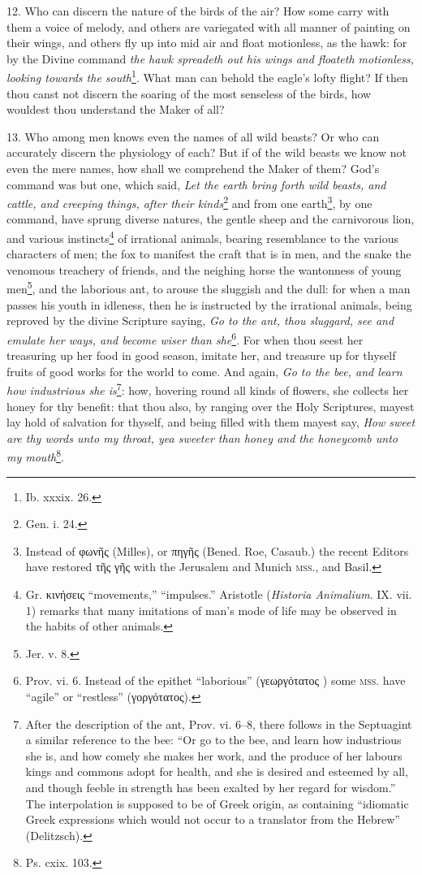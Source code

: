 12. Who can discern the nature of the birds of the air? How some carry with them a voice of melody, and others are variegated with all manner of painting on their wings, and others fly up into mid air and float motionless, as the hawk: for by the Divine command \emph{the hawk spreadeth out his wings and floateth motionless, looking towards the south}\footnote{Ib. xxxix. 26.}. What man can behold the eagle’s lofty flight? If then thou canst not discern the soaring of the most senseless of the birds, how wouldest thou understand the Maker of all?

13. Who among men knows even the names of all wild beasts? Or who can accurately discern the physiology of each? But if of the wild beasts we know not even the mere names, how shall we comprehend the Maker of them? God’s command was but one, which said, \emph{Let the earth bring forth wild beasts, and cattle, and creeping things, after their kinds}\footnote{Gen. i. 24.} and from one earth\footnote{Instead of \textgreek{φωνῆς} (Milles), or \textgreek{πηγῆς} (Bened. Roe, Casaub.) the recent Editors have restored \textgreek{τῆς γῆς} with the Jerusalem and Munich \textsc{mss.}, and Basil.}, by one command, have sprung diverse natures, the gentle sheep and the carnivorous lion, and various instincts\footnote{Gr. \textgreek{κινήσεις} “movements,” “impulses.” Aristotle (\emph{Historia Animalium}. IX. vii. 1) remarks that many imitations of man’s mode of life may be observed in the habits of other animals.} of irrational animals, bearing resemblance to the various characters of men; the fox to manifest the craft that is in men, and the snake the venomous treachery of friends, and the neighing horse the wantonness of young men\footnote{Jer. v. 8.}, and the laborious ant, to arouse the sluggish and the dull: for when a man passes his youth in idleness, then he is instructed by the irrational animals, being reproved by the divine Scripture saying, \emph{Go to the ant, thou sluggard, see and emulate her ways, and become wiser than she}\footnote{Prov. vi. 6. Instead of the epithet “laborious” (\textgreek{γεωργότατος} ) some \textsc{mss.} have “agile” or “restless” (\textgreek{γοργότατος}).}. For when thou seest her treasuring up her food in good season, imitate her, and treasure up for thyself fruits of good works for the world to come. And again, \emph{Go to the bee, and learn how industrious she is}\footnote{After the description of the ant, Prov. vi. 6–8, there follows in the Septuagint a similar reference to the bee: “Or go to the bee, and learn how industrious she is, and how comely she makes her work, and the produce of her labours kings and commons adopt for health, and she is desired and esteemed by all, and though feeble in strength has been exalted by her regard for wisdom.” The interpolation is supposed to be of Greek origin, as containing “idiomatic Greek expressions which would not occur to a translator from the Hebrew” (Delitzsch).}: how, hovering round all kinds of flowers, she collects her honey for thy benefit: that thou also, by ranging over the Holy Scriptures, mayest lay hold of salvation for thyself, and being filled with them mayest say, \emph{How sweet are thy words unto my throat, yea sweeter than honey and the honeycomb unto my mouth}\footnote{Ps. cxix. 103.}.

